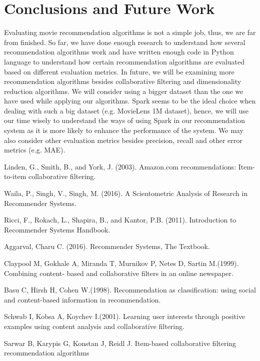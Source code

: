 \documentclass[12pt,a4paper]{report}
\begin{document}
{ \chapter{Conclusions and Future Work}}

Evaluating movie recommendation algorithms is not a simple job, thus, we are far from finished. So far, we have done enough research to understand how several recommendation algorithms work and have written enough code in Python language to understand how certain recommendation algorithms are evaluated based on different evaluation metrics. In future, we will be examining more recommendation algorithms besides collaborative filtering and dimensionality reduction algorithms. We will consider using a bigger dataset than the one we have used while applying our algorithms. Spark seems to be the ideal choice when dealing with such a big dataset (e.g. MovieLens 1M dataset), hence, we will use our time wisely to understand the ways of using Spark in our recommendation system as it is more likely to enhance the performance of the system. We may also consider other evaluation metrics besides precision, recall and other error metrics (e.g. MAE).

\begin{thebibliography}{}

Linden, G., Smith, B., and York, J. (2003). Amazon.com recommendations: Item-to-item collaborative filtering. 

Waila, P., Singh, V., Singh, M. (2016). A Scientometric Analysis of Research in Recommender Systems.

Ricci, F., Rokach, L., Shapira, B., and Kantor, P.B. (2011). Introduction to Recommender Systems Handbook.

Aggarval, Charu C. (2016). Recommender Systems, The Textbook.

Claypool M, Gokhale A, Miranda T, Murnikov P, Netes D, Sartin M.(1999). Combining content- based and collaborative filters in an online newspaper.

Basu C, Hirsh H, Cohen W.(1998). Recommendation as classification: using social and content-based information in recommendation.

Schwab I, Kobsa A, Koychev I.(2001). Learning user interests through positive examples using content analysis and collaborative filtering.

Sarwar B, Karypis G, Konstan J, Reidl J. Item-based collaborative filtering recommendation algorithms

\end{thebibliography}
\end{document}
